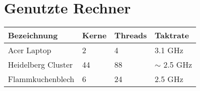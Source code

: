 \section*{Genutzte Rechner}

{\setlength{\extrarowheight}{10pt}%
\begin{tabular}{l | l | l | l}
  Bezeichnung         & Kerne  & Threads & Taktrate \\[0.25ex] \hline
  Acer Laptop         & 2      & 4  & 3.1 GHz \\
  Heidelberg Cluster  & 44     & 88 & \( \sim \) 2.5 GHz \\
  Flammkuchenblech    & 6      & 24 & 2.5 GHz \\

\end{tabular}
}
